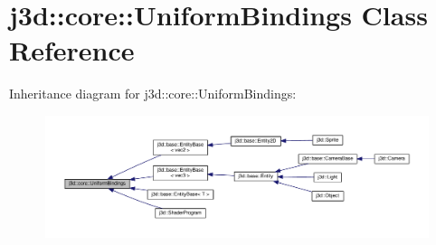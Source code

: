 \hypertarget{classj3d_1_1core_1_1UniformBindings}{}\section{j3d\+:\+:core\+:\+:Uniform\+Bindings Class Reference}
\label{classj3d_1_1core_1_1UniformBindings}


Inheritance diagram for j3d\+:\+:core\+:\+:Uniform\+Bindings\+:
\nopagebreak
\begin{figure}[H]
\begin{center}
\leavevmode
\includegraphics[width=350pt]{classj3d_1_1core_1_1UniformBindings__inherit__graph}
\end{center}
\end{figure}

